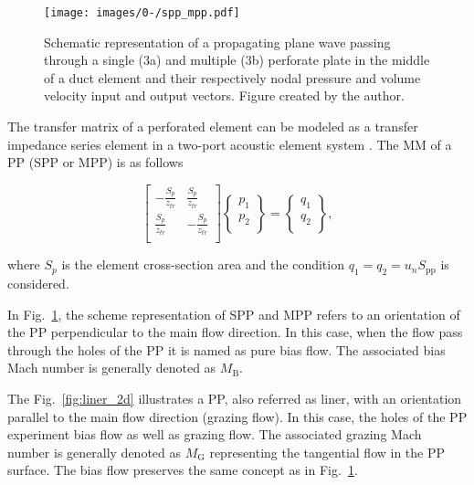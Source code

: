 \documentclass[12pt]{article}
\begin{document}
\begin{figure}[h!]
	\centering
	\texttt{[image: images/0-/spp\_mpp.pdf]}
	\caption{Schematic representation of a propagating plane wave passing through a single (3a) and multiple (3b) perforate plate in the middle of a duct element and their respectively nodal pressure and volume velocity input and output vectors. Figure created by the author.}
	\label{fig:z_transf_scheme}
\end{figure}

The transfer matrix of a perforated element can be modeled as a transfer impedance series element in a two-port acoustic element system \cite{xin_thesis}. The \acrshort{MM} of a \acrfull{PP} (\acrfull{SPP} or \acrfull{MPP}) is as follows

\begin{equation} \label{eq:ztr_mm}
	\begin{bmatrix}
		-\frac{ S_p }{z_{tr}} & \frac{ S_p }{z_{tr}} \\
		\frac{ S_p }{z_{tr}} & -\frac{ S_p }{z_{tr}}\\
	\end{bmatrix}
	\begin{Bmatrix}
		p_1 \\
		p_2 \\
	\end{Bmatrix}
	=
	\begin{Bmatrix}
		q_1 \\
		q_2 \\
	\end{Bmatrix},
\end{equation}

\noindent where $S_p$ is the element cross-section area and the condition $q_1=q_2=u_n S_{\text{pp}}$ is considered.

In Fig.~\ref{fig:z_transf_scheme}, the scheme representation of \acrfull{SPP} and \acrfull{MPP} refers to an orientation of the \acrshort{PP} perpendicular to the main flow direction. In this case, when the flow pass through the holes of the \acrshort{PP} it is named as pure bias flow. The associated bias Mach number is generally denoted as $M_{\text{B}}$. 

The Fig.~\ref{fig:liner_2d} illustrates a \acrshort{PP}, also referred as liner, with an orientation parallel to the main flow direction (grazing flow). In this case, the holes of the \acrshort{PP} experiment bias flow as well as grazing flow. The associated grazing Mach number is generally denoted as $M_{\text{G}}$ representing the tangential flow in the \acrshort{PP} surface. The bias flow preserves the same concept as in Fig.~\ref{fig:z_transf_scheme}.
\end{document}
